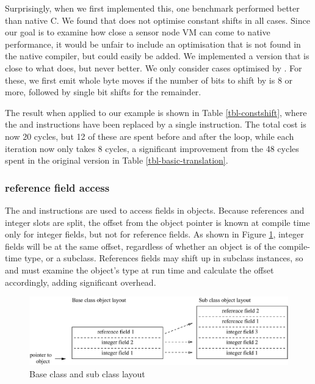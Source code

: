 Surprisingly, when we first implemented this, one benchmark performed better than native C. We found that  does not optimise constant shifts in all cases. Since our goal is to examine how close a sensor node VM can come to native performance, it would be unfair to include an optimisation that is not found in the native compiler, but could easily be added. We implemented a version that is close to what  does, but never better. We only consider cases optimised by . For these, we first emit whole byte moves if the number of bits to shift by is 8 or more, followed by single bit shifts for the remainder.

The result when applied to our example is shown in Table \ref{tbl-constshift}, where the  and  instructions have been replaced by a single  instruction. The total cost is now 20 cycles, but 12 of these are spent before and after the loop, while each iteration now only takes 8 cycles, a significant improvement from the 48 cycles spent in the original version in Table \ref{tbl-basic-translation}.


\subsubsection{ reference field access}
The  and  instructions are used to access fields in objects. Because references and integer slots are split, the offset from the object pointer is known at compile time only for integer fields, but not for reference fields. As shown in Figure \ref{fig-super-class-sub-class-field-layout}, integer fields will be at the same offset, regardless of whether an object is of the compile-time type, or a subclass. References fields may shift up in subclass instances, so  and  must examine the object's type at run time and calculate the offset accordingly, adding significant overhead.

\begin{figure}
\centering
\includegraphics[width=0.7\linewidth]{super-class-sub-class-field-layout.eps}
\caption{Base class and sub class layout}
\label{fig-super-class-sub-class-field-layout}
\end{figure}


